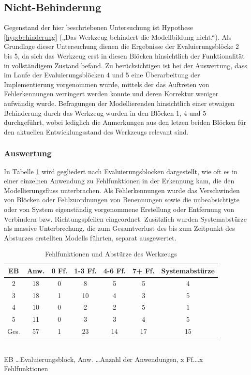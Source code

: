 
\subsection{Nicht-Behinderung} %
\label{sub:nicht_behinderung}

Gegenstand der hier beschriebenen Untersuchung ist Hypothese \ref{hyp:behinderung} („Das Werkzeug behindert die Modellbildung nicht.“). Als Grundlage dieser Untersuchung dienen die Ergebnisse der Evaluierungsblöcke 2 bis 5, da sich das Werkzeug erst in diesen Blöcken hinsichtlich der Funktionalität in vollständigem Zustand befand. Zu berücksichtigen ist bei der Auswertung, dass im Laufe der Evaluierungsblöcken 4 und 5 eine Überarbeitung der Implementierung vorgenommen wurde, mittels der das Auftreten von Fehlerkennungen verringert werden konnte und deren Korrektur weniger aufwändig wurde. Befragungen der Modellierenden hinsichtlich einer etwaigen Behinderung durch das Werkzeug wurden in den Blöcken 1, 4 und 5 durchgeführt, wobei lediglich die Anmerkungen aus den letzen beiden Blöcken für den aktuellen Entwicklungsstand des Werkzeugs relevant sind.

\subsubsection{Auswertung} 

In Tabelle \ref{tab:fehlfunktionen} wird gegliedert nach Evaluierungsblocken dargestellt, wie oft es in einer einzelnen Anwendung zu Fehlfunktionen in der Erkennung kam, die den Modellierungsfluss unterbrachen. Als Fehlerkennungen wurde das Verschwinden von Blöcken oder Fehlzuordnungen von Benennungen sowie die unbeabsichtigte oder von System eigenständig vorgenommene Erstellung oder Entfernung von Verbindern bzw. Richtungspfeilen eingeordnet. Zusätzlich wurden Systemabstürze als massive Unterbrechung, die zum Gesamtverlust des bis zum Zeitpunkt des Absturzes erstellten Modells führten, separat ausgewertet.

\begin{table}[htbp]
	\centering
	\caption{Fehlfunktionen und Abstürze des Werkzeugs}
\begin{tabular}{| c || c || c | c | c | c || c |}
  \hline
   EB    & Anw. & 0 Ff. & 1-3 Ff. & 4-6 Ff. & 7+ Ff. & Systemabstürze \\ \hline
   2     & 18 & 0 &  8 &  5 &  5 &  4 \\ 
   3     & 18 & 1 & 10 &  4 &  3 &  5 \\ 
   4     & 10 & 0 &  2 &  2 &  5 &  1 \\ 
   5     & 11 & 0 &  3 &  3 &  4 &  5 \\ \hline
   Ges.  & 57 & 1 & 23 & 14 & 17 & 15 \\ \hline
\end{tabular} \\
\footnotesize EB \ldots Evaluierungsblock, Anw. \ldots Anzahl der Anwendungen, x Ff.\ldots x Fehlfunktionen
	\label{tab:fehlfunktionen}
\end{table}

